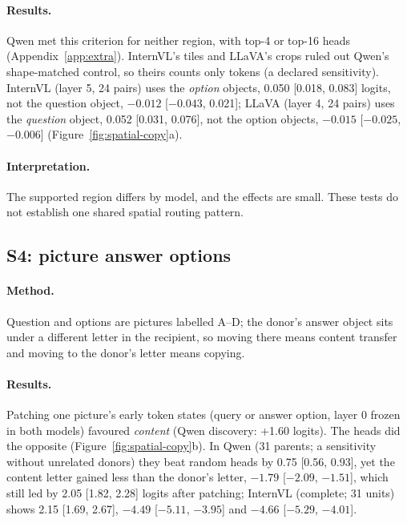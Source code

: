 \documentclass[11pt]{article}
\begin{document}
\paragraph{Results.} Qwen met this criterion for neither region, with top-4 or top-16 heads (Appendix~\ref{app:extra}). InternVL's tiles and LLaVA's crops ruled out Qwen's shape-matched control, so theirs counts only tokens (a declared sensitivity). InternVL (layer 5, 24 pairs) uses the \emph{option} objects, 0.050 [0.018, 0.083] logits, not the question object, $-0.012$ [$-0.043$, 0.021]; LLaVA (layer 4, 24 pairs) uses the \emph{question} object, 0.052 [0.031, 0.076], not the option objects, $-0.015$ [$-0.025$, $-0.006$] (Figure~\ref{fig:spatial-copy}a).

\paragraph{Interpretation.} The supported region differs by model, and the effects are small. These tests do not establish one shared spatial routing pattern.

\subsection{S4: picture answer options}

\paragraph{Method.} Question and options are pictures labelled A--D; the donor's answer object sits under a different letter in the recipient, so moving there means content transfer and moving to the donor's letter means copying.

\paragraph{Results.} Patching one picture's early token states (query or answer option, layer 0 frozen in both models) favoured \emph{content} (Qwen discovery: +1.60 logits). The heads did the opposite (Figure~\ref{fig:spatial-copy}b). In Qwen (31 parents; a sensitivity without unrelated donors) they beat random heads by 0.75 [0.56, 0.93], yet the content letter gained less than the donor's letter, $-1.79$ [$-2.09$, $-1.51$], which still led by 2.05 [1.82, 2.28] logits after patching; InternVL (complete; 31 units) shows 2.15 [1.69, 2.67], $-4.49$ [$-5.11$, $-3.95$] and $-4.66$ [$-5.29$, $-4.01$].
\end{document}
